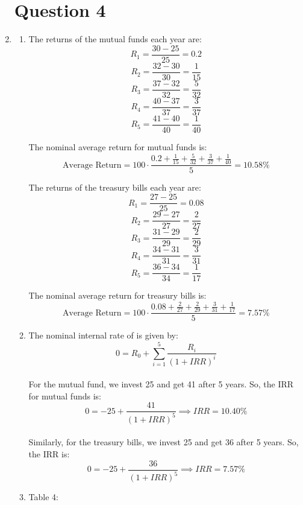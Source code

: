 \documentclass[a4paper]{article}
\begin{document}
\begin{enumerate}
    \newpage
    \section*{Question 4}
    \item \begin{enumerate}
        \item The returns of the mutual funds each year are:
        \[ R_1 = \frac{30 - 25}{25} = 0.2 \]
        \[ R_2 = \frac{32 - 30}{30} = \frac{1}{15} \]
        \[ R_3 = \frac{37 - 32}{32} = \frac{5}{32} \]
        \[ R_4 = \frac{40 - 37}{37} = \frac{3}{37} \]
        \[ R_5 = \frac{41 - 40}{40} = \frac{1}{40} \]
        
        \vspace{3mm}
        The nominal average return for mutual funds is:
        \[ \text{Average Return} = 100 \cdot \frac{0.2 + \frac{1}{15} + \frac{5}{32} + \frac{3}{37} + \frac{1}{40}}{5} = 10.58\% \]

        \vspace{10mm}
        The returns of the treasury bills each year are:
        \[ R_1 = \frac{27 - 25}{25} = 0.08 \]
        \[ R_2 = \frac{29 - 27}{27} = \frac{2}{27} \]
        \[ R_3 = \frac{31 - 29}{29} = \frac{2}{29} \]
        \[ R_4 = \frac{34 - 31}{31} = \frac{3}{31} \]
        \[ R_5 = \frac{36 - 34}{34} = \frac{1}{17} \]

        \vspace{3mm}
        The nominal average return for treasury bills is:
        \[ \text{Average Return} = 100 \cdot \frac{0.08 + \frac{2}{27} + \frac{2}{29} + \frac{3}{31} + \frac{1}{17}}{5} = 7.57\% \]

        \vspace{15mm}
        \item The nominal internal rate of is given by:
        \[ 0 = R_0 + \sum_{i=1}^{5} \frac{R_i}{(1 + IRR)^i} \] \\

        For the mutual fund, we invest 25 and get 41 after 5 years. So, the IRR for mutual funds is:
        \[ 0 = -25 + \frac{41}{(1 + IRR)^5} \implies IRR = 10.40\% \] \\

        Similarly, for the treasury bills, we invest 25 and get 36 after 5 years. So, the IRR is:
        \[ 0 = -25 + \frac{36}{(1 + IRR)^5} \implies IRR = 7.57\% \]

        \newpage
        \item Table 4:


\end{enumerate}
\end{enumerate}
\end{document}
